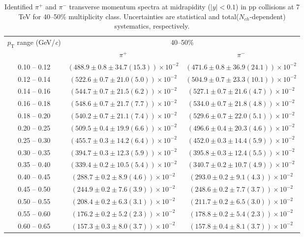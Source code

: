 \begin{table}
\caption{Identified $\pi^{+}$ and $\pi^{-}$  transverse momentum spectra at midrapidity ($|y|<0.1$) in pp collisions at 7 TeV for 40--50\% multiplicity class. Uncertainties are statistical and total($N_{ch}$-dependent) systematics, respectively.}
\label{tab:PionPlus_PionMinus_40to50}
\begin{center}
\begin{tabular}{ c | c c }
\hline
\multirow{2}{*}{$p_{\mathrm{T}}$ range (GeV/\textit{c})} & \multicolumn{2}{c}{40--50\%} \\ & $\pi^{+}$& $\pi^{-}$\\ 
\hline
0.10 -- 0.12 & $(488.9\pm0.8\pm34.7(15.3))\times10^{-2}$ & $(471.6\pm0.8\pm36.9(24.1))\times10^{-2}$ \\ 
0.12 -- 0.14 & $(522.6\pm0.7\pm21.0(5.0))\times10^{-2}$ & $(504.9\pm0.7\pm23.3(10.1))\times10^{-2}$ \\ 
0.14 -- 0.16 & $(544.7\pm0.7\pm21.5(6.2))\times10^{-2}$ & $(527.1\pm0.7\pm21.6(4.7))\times10^{-2}$ \\ 
0.16 -- 0.18 & $(548.6\pm0.7\pm21.7(7.7))\times10^{-2}$ & $(534.0\pm0.7\pm21.8(4.8))\times10^{-2}$ \\ 
0.18 -- 0.20 & $(540.2\pm0.7\pm21.1(7.4))\times10^{-2}$ & $(529.6\pm0.7\pm22.0(5.1))\times10^{-2}$ \\ 
0.20 -- 0.25 & $(509.5\pm0.4\pm19.9(6.6))\times10^{-2}$ & $(496.6\pm0.4\pm20.3(4.6))\times10^{-2}$ \\ 
0.25 -- 0.30 & $(455.7\pm0.3\pm14.2(6.4))\times10^{-2}$ & $(452.0\pm0.3\pm14.4(5.9))\times10^{-2}$ \\ 
0.30 -- 0.35 & $(394.7\pm0.3\pm12.3(5.9))\times10^{-2}$ & $(395.8\pm0.3\pm12.4(5.5))\times10^{-2}$ \\ 
0.35 -- 0.40 & $(339.4\pm0.2\pm10.5(5.4))\times10^{-2}$ & $(340.7\pm0.2\pm10.7(4.9))\times10^{-2}$ \\ 
0.40 -- 0.45 & $(288.7\pm0.2\pm8.9(4.6))\times10^{-2}$ & $(293.0\pm0.2\pm9.1(4.3))\times10^{-2}$ \\ 
0.45 -- 0.50 & $(244.9\pm0.2\pm7.6(3.9))\times10^{-2}$ & $(248.6\pm0.2\pm7.7(3.7))\times10^{-2}$ \\ 
0.50 -- 0.55 & $(208.4\pm0.2\pm6.3(3.1))\times10^{-2}$ & $(211.7\pm0.2\pm6.5(3.0))\times10^{-2}$ \\ 
0.55 -- 0.60 & $(176.2\pm0.2\pm5.2(2.3))\times10^{-2}$ & $(178.8\pm0.2\pm5.4(2.3))\times10^{-2}$ \\ 
0.60 -- 0.65 & $(157.3\pm0.3\pm8.0(3.7))\times10^{-2}$ & $(157.8\pm0.4\pm8.1(3.7))\times10^{-2}$ \\ 

\end{tabular}
\end{center}
\end{table}
